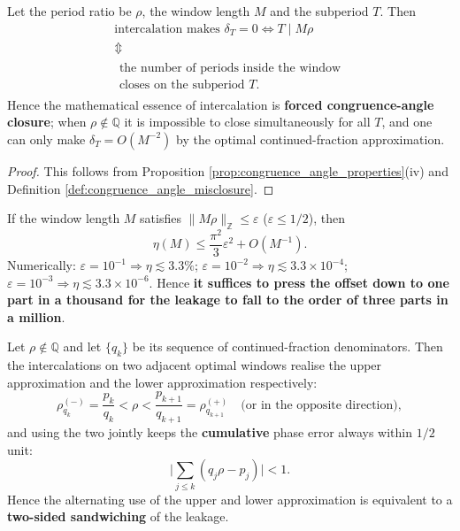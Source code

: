 \begin{theorem}\label{thm:intercalation_congruence_closure}
Let the period ratio be $\rho$, the window length $M$ and the subperiod $T$. Then
\[
\begin{gathered}
\text{intercalation makes }\delta_T=0
\iff T\mid M\rho
\\ \Updownarrow \\
\begin{gathered}
\text{the number of periods inside the window}\\
\text{closes on the subperiod }T.
\end{gathered}
\end{gathered}
\]
Hence the mathematical essence of intercalation is \textbf{forced congruence-angle closure}; when $\rho\notin\mathbb{Q}$ it is impossible to close simultaneously for all $T$, and one can only make $\delta_T=O(M^{-2})$ by the optimal continued-fraction approximation.
\end{theorem}

\begin{proof}
This follows from Proposition \ref{prop:congruence_angle_properties}(iv) and Definition \ref{def:congruence_angle_misclosure}.
\end{proof}

\begin{corollary}\label{cor:intercalation_suppression_sufficient}
If the window length $M$ satisfies $\|M\rho\|_{\mathbb{Z}}\le\varepsilon$ ($\varepsilon\le1/2$), then
\[
\eta(M)\le\frac{\pi^2}{3}\varepsilon^2+O(M^{-1}).
\]
Numerically: $\varepsilon=10^{-1}\Rightarrow\eta\lesssim3.3\%$; $\varepsilon=10^{-2}\Rightarrow\eta\lesssim3.3\times10^{-4}$; $\varepsilon=10^{-3}\Rightarrow\eta\lesssim3.3\times10^{-6}$. Hence \textbf{it suffices to press the offset down to one part in a thousand for the leakage to fall to the order of three parts in a million}.
\end{corollary}

\begin{proposition}\label{prop:optimal_joint_suppression}
Let $\rho\notin\mathbb{Q}$ and let $\{q_k\}$ be its sequence of continued-fraction denominators. Then the intercalations on two adjacent optimal windows realise the upper approximation and the lower approximation respectively:
\[
\rho^{(-)}_{q_k}=\frac{p_k}{q_k}<\rho<\frac{p_{k+1}}{q_{k+1}}=\rho^{(+)}_{q_{k+1}}
\quad\text{(or in the opposite direction)},
\]
and using the two jointly keeps the \textbf{cumulative} phase error always within $1/2$ unit:
\[
\Big|\sum_{j\le k}(q_j\rho-p_j)\Big|<1 .
\]
Hence the alternating use of the upper and lower approximation is equivalent to a \textbf{two-sided sandwiching} of the leakage.
\end{proposition}


